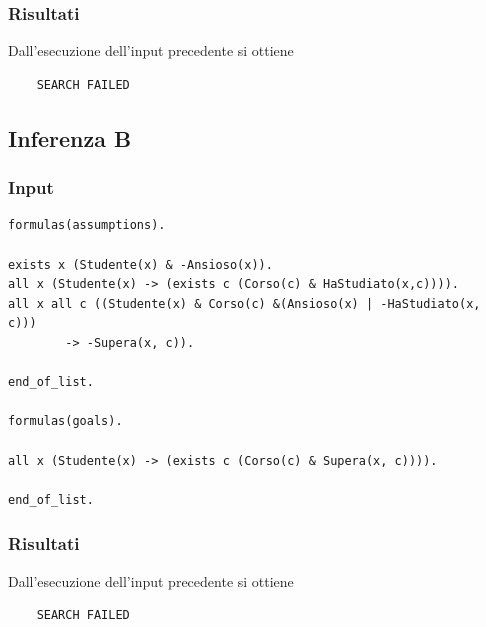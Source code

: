 \documentclass[a4paper, 12pt]{article}
\begin{document}
\subsubsection{Risultati}
Dall'esecuzione dell'input precedente si ottiene
\begin{verbatim}
    SEARCH FAILED
\end{verbatim}
\subsection{Inferenza B}
\subsubsection{Input}
\begin{verbatim}
formulas(assumptions).

exists x (Studente(x) & -Ansioso(x)).
all x (Studente(x) -> (exists c (Corso(c) & HaStudiato(x,c)))).
all x all c ((Studente(x) & Corso(c) &(Ansioso(x) | -HaStudiato(x, c))) 
        -> -Supera(x, c)).

end_of_list.

formulas(goals).

all x (Studente(x) -> (exists c (Corso(c) & Supera(x, c)))).

end_of_list.
\end{verbatim}
\subsubsection{Risultati}
Dall'esecuzione dell'input precedente si ottiene
\begin{verbatim}
    SEARCH FAILED
\end{verbatim}
\end{document}
